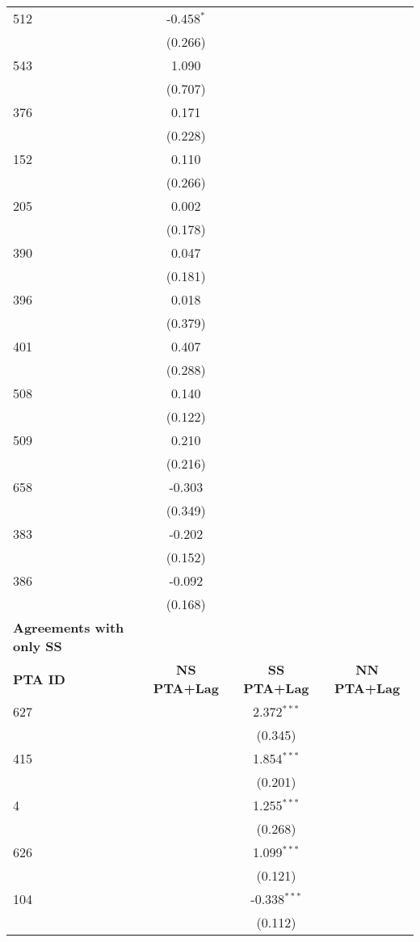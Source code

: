 \begin{longtable}{lccc}
    512 & -0.458$^{\ast}$ &  &  \\
    & (0.266) &  &  \\
    543 & 1.090 &  &  \\
    & (0.707) &  &  \\
    376 & 0.171 &  &  \\
    & (0.228) &  &  \\
    152 & 0.110 &  &  \\
    & (0.266) &  &  \\
    205 & 0.002 &  &  \\
    & (0.178) &  &  \\
    390 & 0.047 &  &  \\
    & (0.181) &  &  \\
    396 & 0.018 &  &  \\
    & (0.379) &  &  \\
    401 & 0.407 &  &  \\
    & (0.288) &  &  \\
    508 & 0.140 &  &  \\
    & (0.122) &  &  \\
    509 & 0.210 &  &  \\
    & (0.216) &  &  \\
    658 & -0.303 &  &  \\
    & (0.349) &  &  \\
    383 & -0.202 &  &  \\
    & (0.152) &  &  \\
    386 & -0.092 &  &  \\
    & (0.168) &  &  \\
    \hline
    \textbf{Agreements with only SS} &  &  &  \\
    \hline
    \textbf{PTA ID} & \textbf{NS PTA+Lag} & \textbf{SS PTA+Lag} & \textbf{NN PTA+Lag} \\
    \hline
    627 &  & 2.372$^{\ast\ast\ast}$ &  \\
    &  & (0.345) &  \\
    415   &  & 1.854$^{\ast\ast\ast}$ &  \\
    &  & (0.201) &  \\
    4   &  & 1.255$^{\ast\ast\ast}$ &  \\
    &  & (0.268) &  \\
    626 &  & 1.099$^{\ast\ast\ast}$ &  \\
    &  & (0.121) &  \\
    104 &  & -0.338$^{\ast\ast\ast}$ &  \\
    &  & (0.112) &  \\

\end{longtable}
